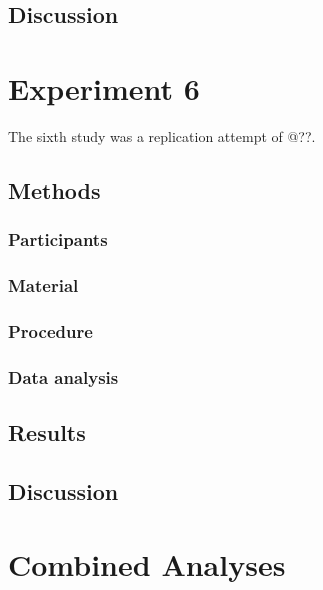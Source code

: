 \documentclass[
  english,
  man]{apa6}
\begin{document}
\hypertarget{discussion-4}{%
\subsection{Discussion}\label{discussion-4}}

\hypertarget{experiment-6}{%
\section{Experiment 6}\label{experiment-6}}

The sixth study was a replication attempt of @??.

\hypertarget{methods-5}{%
\subsection{Methods}\label{methods-5}}

\hypertarget{participants-5}{%
\subsubsection{Participants}\label{participants-5}}

\hypertarget{material-4}{%
\subsubsection{Material}\label{material-4}}

\hypertarget{procedure-5}{%
\subsubsection{Procedure}\label{procedure-5}}

\hypertarget{data-analysis-4}{%
\subsubsection{Data analysis}\label{data-analysis-4}}

\hypertarget{results-5}{%
\subsection{Results}\label{results-5}}

\hypertarget{discussion-5}{%
\subsection{Discussion}\label{discussion-5}}

\hypertarget{combined-analyses}{%
\section{Combined Analyses}\label{combined-analyses}}
\end{document}
